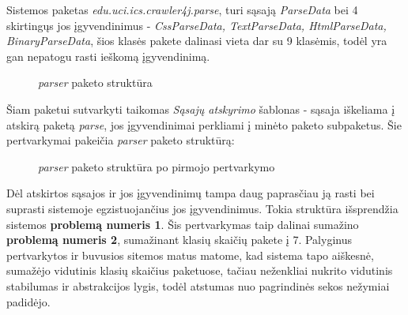 Sistemos paketas \textit{edu.uci.ics.crawler4j.parse}, turi sąsają \textit{ParseData} bei 4 skirtingųs jos įgyvendinimus - \textit{CssParseData, TextParseData, HtmlParseData, BinaryParseData},
šios klasės pakete dalinasi vieta dar su 9 klasėmis, todėl yra gan nepatogu rasti ieškomą įgyvendinimą.
\begin{figure}[H]
    \snugshade
    \endsnugshade
    \caption{\textit{parser} paketo struktūra}
\end{figure}
Šiam paketui sutvarkyti taikomas \textit{Sąsajų atskyrimo} šablonas - sąsaja iškeliama į atskirą paketą \textit{parse}, jos įgyvendinimai perkliami į minėto
paketo subpaketus.
Šie pertvarkymai pakeičia \textit{parser} paketo struktūrą:
\begin{figure}[H]
    \snugshade
    \endsnugshade
    \caption{\textit{parser} paketo struktūra po pirmojo pertvarkymo}
\end{figure}
Dėl atskirtos sąsajos ir jos įgyvendinimų tampa daug paprasčiau ją rasti bei suprasti sistemoje egzistuojančius jos įgyvendinimus.
Tokia struktūra išsprendžia sistemos \textbf{problemą numeris 1}.
Šis pertvarkymas taip dalinai sumažino \textbf{problemą numeris 2}, sumažinant klasių skaičių pakete į 7.
Palyginus pertvarkytos ir buvusios sitemos matus matome, kad sistema tapo aiškesnė, sumažėjo vidutinis klasių skaičius paketuose, tačiau neženkliai nukrito
vidutinis stabilumas ir abstrakcijos lygis, todėl atstumas nuo pagrindinės sekos nežymiai padidėjo.
